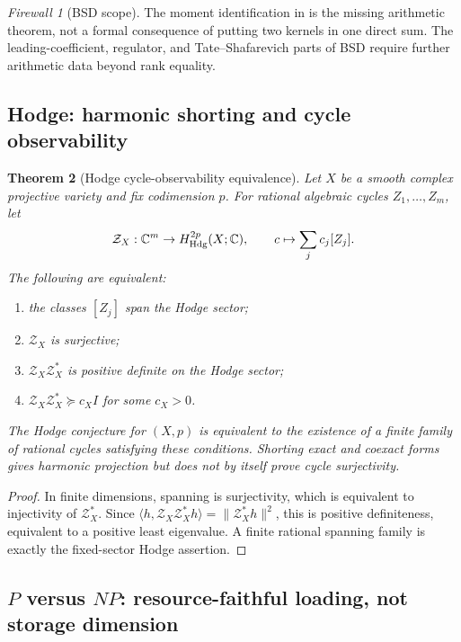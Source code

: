 \documentclass[11pt]{article}
\newtheorem{theorem}{Theorem}[section]
\theoremstyle{definition}
\theoremstyle{remark}
\newtheorem{firewall}[theorem]{Firewall}
\newcommand{\C}{\mathbb C}
\newcommand{\norm}[1]{\lVert#1\rVert}
\begin{document}
\begin{firewall}[BSD scope]
The moment identification in  is the missing
arithmetic theorem, not a formal consequence of putting two kernels in one
direct sum.  The leading-coefficient, regulator, and Tate--Shafarevich parts
of BSD require further arithmetic data beyond rank equality.
\end{firewall}

\subsection{Hodge: harmonic shorting and cycle observability}

\begin{theorem}[Hodge cycle-observability equivalence]
\label{thm:Hodge-master}
Let $X$ be a smooth complex projective variety and fix codimension $p$.
For rational algebraic cycles $Z_1,\ldots,Z_m$, let
\[
 \mathcal Z_X:\C^m\to H_{\rm Hdg}^{2p}(X;\C),
 \qquad c\mapsto\sum_jc_j[Z_j].
\]
The following are equivalent:
\begin{enumerate}[label=\textup{(\roman*)},leftmargin=2.7em]
\item the classes $[Z_j]$ span the Hodge sector;
\item $\mathcal Z_X$ is surjective;
\item $\mathcal Z_X\mathcal Z_X^*$ is positive definite on the Hodge sector;
\item $\mathcal Z_X\mathcal Z_X^*\succeq c_XI$ for some $c_X>0$.
\end{enumerate}
The Hodge conjecture for $(X,p)$ is equivalent to the existence of a finite
family of rational cycles satisfying these conditions.  Shorting exact and
coexact forms gives harmonic projection but does not by itself prove cycle
surjectivity.
\end{theorem}

\begin{proof}
In finite dimensions, spanning is surjectivity, which is equivalent to
injectivity of $\mathcal Z_X^*$.  Since
$\langle h,\mathcal Z_X\mathcal Z_X^*h\rangle=
\norm{\mathcal Z_X^*h}^2$, this is positive definiteness, equivalent to a
positive least eigenvalue.  A finite rational spanning family is exactly the
fixed-sector Hodge assertion.
\end{proof}

\subsection{\texorpdfstring{$P$ versus $NP$}{P versus NP}: resource-faithful loading, not storage dimension}
\end{document}
